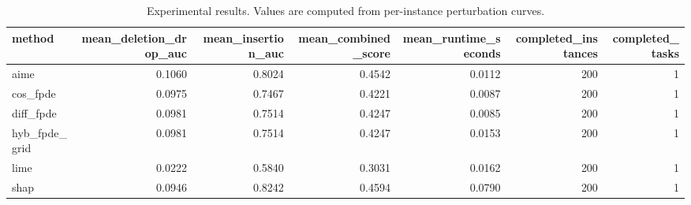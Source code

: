 \begin{table}[t]
\caption{Experimental results. Values are computed from per-instance perturbation curves.}
\label{tab:main_results_computed}
\centering
\begin{tabular}{lrrrrrr}
\toprule
method & mean\_deletion\_drop\_auc & mean\_insertion\_auc & mean\_combined\_score & mean\_runtime\_seconds & completed\_instances & completed\_tasks \\
\midrule
aime & 0.1060 & 0.8024 & 0.4542 & 0.0112 & 200 & 1 \\
cos\_fpde & 0.0975 & 0.7467 & 0.4221 & 0.0087 & 200 & 1 \\
diff\_fpde & 0.0981 & 0.7514 & 0.4247 & 0.0085 & 200 & 1 \\
hyb\_fpde\_grid & 0.0981 & 0.7514 & 0.4247 & 0.0153 & 200 & 1 \\
lime & 0.0222 & 0.5840 & 0.3031 & 0.0162 & 200 & 1 \\
shap & 0.0946 & 0.8242 & 0.4594 & 0.0790 & 200 & 1 \\
\bottomrule
\end{tabular}

\end{table}
